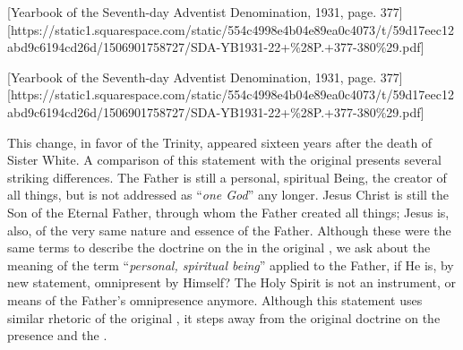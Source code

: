 

[Yearbook of the Seventh-day Adventist Denomination, 1931, page. 377][https://static1.squarespace.com/static/554c4998e4b04e89ea0c4073/t/59d17eec12abd9c6194cd26d/1506901758727/SDA-YB1931-22+\%28P.+377-380\%29.pdf]


[Yearbook of the Seventh-day Adventist Denomination, 1931, page. 377][https://static1.squarespace.com/static/554c4998e4b04e89ea0c4073/t/59d17eec12abd9c6194cd26d/1506901758727/SDA-YB1931-22+\%28P.+377-380\%29.pdf]


This change, in favor of the Trinity, appeared sixteen years after the death of Sister White. A comparison of this statement with the original  presents several striking differences. The Father is still a personal, spiritual Being, the creator of all things, but is not addressed as “\textit{one God}” any longer. Jesus Christ is still the Son of the Eternal Father, through whom the Father created all things; Jesus is, also, of the very same nature and essence of the Father. Although these were the same terms to describe the doctrine on the  in the original , we ask about the meaning of the term “\textit{personal, spiritual being}” applied to the Father, if He is, by new statement, omnipresent by Himself? The Holy Spirit is not an instrument, or means of the Father’s omnipresence anymore. Although this statement uses similar rhetoric of the original , it steps away from the original doctrine on the presence and the .


